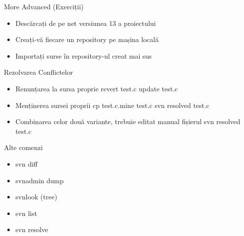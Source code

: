 \documentclass{beamer}
\begin{document}
\begin{frame}{More Advanced (Exerciții)}
\begin{itemize} %
\item Descărcați de pe net versiunea 13 a proiectului
\newline 
\item Creați-vă fiecare un repository pe mașina locală 
\newline 
\item Importați surse în repository-ul creat mai sus
\newline 
\end{itemize}
\end{frame}

\begin{frame}{Rezolvarea Conflictelor}
\begin{itemize} %
\item Renunțarea la sursa proprie
\newline revert test.c
\newline update test.c
\newline
\item Menținerea sursei proprii
\newline cp test.c.mine test.c
\newline svn resolved test.c
\newline 
\item Combinarea celor două variante, trebuie editat manual fișierul
\newline svn resolved test.c
\newline
\end{itemize}
\end{frame}

\begin{frame}{Alte comenzi}
\begin{itemize} %
\item svn diff
\newline
\item svnadmin dump
\newline
\item svnlook (tree)
\newline
\item svn list
\newline
\item svn resolve
\end{itemize}
\end{frame}
\end{document}

